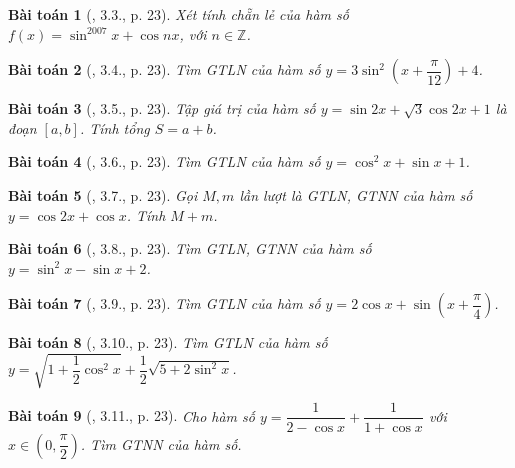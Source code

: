 \documentclass{article}
\newtheorem{baitoan}{Bài toán}
\begin{document}
\begin{baitoan}[\cite{Hung_nang_cao_phat_trien_Toan_11_tap_1}, 3.3., p. 23]
	Xét tính chẵn lẻ của hàm số $f(x) = \sin^{2007}x + \cos nx$, với $n\in\mathbb{Z}$.
\end{baitoan}

\begin{baitoan}[\cite{Hung_nang_cao_phat_trien_Toan_11_tap_1}, 3.4., p. 23]
	Tìm {\rm GTLN} của hàm số $y = 3\sin^2\left(x + \dfrac{\pi}{12}\right) + 4$.
\end{baitoan}

\begin{baitoan}[\cite{Hung_nang_cao_phat_trien_Toan_11_tap_1}, 3.5., p. 23]
	Tập giá trị của hàm số $y = \sin2x + \sqrt{3}\cos2x + 1$ là đoạn $[a,b]$. Tính tổng $S = a + b$.
\end{baitoan}

\begin{baitoan}[\cite{Hung_nang_cao_phat_trien_Toan_11_tap_1}, 3.6., p. 23]
	Tìm {\rm GTLN} của hàm số $y = \cos^2x + \sin x + 1$.
\end{baitoan}

\begin{baitoan}[\cite{Hung_nang_cao_phat_trien_Toan_11_tap_1}, 3.7., p. 23]
	Gọi $M,m$ lần lượt là {\rm GTLN, GTNN} của hàm số $y = \cos2x + \cos x$. Tính $M + m$.
\end{baitoan}

\begin{baitoan}[\cite{Hung_nang_cao_phat_trien_Toan_11_tap_1}, 3.8., p. 23]
	Tìm {\rm GTLN, GTNN} của hàm số $y = \sin^2x - \sin x + 2$.
\end{baitoan}

\begin{baitoan}[\cite{Hung_nang_cao_phat_trien_Toan_11_tap_1}, 3.9., p. 23]
	Tìm {\rm GTLN} của hàm số $y = 2\cos x + \sin\left(x + \dfrac{\pi}{4}\right)$.
\end{baitoan}

\begin{baitoan}[\cite{Hung_nang_cao_phat_trien_Toan_11_tap_1}, 3.10., p. 23]
	Tìm {\rm GTLN} của hàm số $y = \sqrt{1 + \dfrac{1}{2}\cos^2x} + \dfrac{1}{2}\sqrt{5 + 2\sin^2x}$.
\end{baitoan}

\begin{baitoan}[\cite{Hung_nang_cao_phat_trien_Toan_11_tap_1}, 3.11., p. 23]
	Cho hàm số $y = \dfrac{1}{2 - \cos x} + \dfrac{1}{1 + \cos x}$ với $x\in\left(0,\dfrac{\pi}{2}\right)$. Tìm {\rm GTNN} của hàm số.
\end{baitoan}
\end{document}
